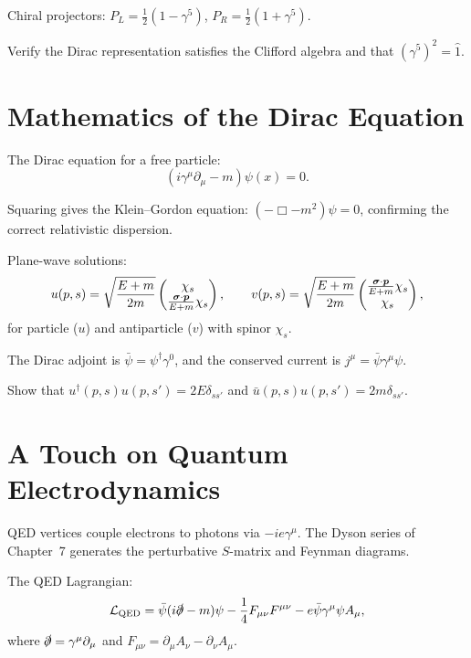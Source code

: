 Chiral projectors: $P_L=\frac12(1-\gamma^5)$, $P_R=\frac12(1+\gamma^5)$.

\begin{exercise}
Verify the Dirac representation satisfies the Clifford algebra and that
$(\gamma^5)^2=\hat 1$.
\end{exercise}

\section{Mathematics of the Dirac Equation}

The Dirac equation for a free particle:
\begin{equation}
(i\gamma^\mu\partial_\mu - m)\psi(x) = 0.
\label{eq:10.7.1}
\end{equation}

Squaring gives the Klein--Gordon equation:
$(-\Box-m^2)\psi=0$, confirming the correct relativistic dispersion.

Plane-wave solutions:
\begin{equation}
u(p,s) = \sqrt{\frac{E+m}{2m}}
\begin{pmatrix}\chi_s\\\frac{\bm{\sigma}\cdot\bm{p}}{E+m}\chi_s\end{pmatrix},\qquad
v(p,s) = \sqrt{\frac{E+m}{2m}}
\begin{pmatrix}\frac{\bm{\sigma}\cdot\bm{p}}{E+m}\chi_s\\\chi_s\end{pmatrix},
\label{eq:10.7.2}
\end{equation}
for particle ($u$) and antiparticle ($v$) with spinor $\chi_s$.

The Dirac adjoint is $\bar\psi=\psi^\dagger\gamma^0$, and the conserved
current is $j^\mu=\bar\psi\gamma^\mu\psi$.

\begin{exercise}
Show that $u^\dagger(p,s)u(p,s')=2E\delta_{ss'}$ and
$\bar u(p,s)u(p,s')=2m\delta_{ss'}$.
\end{exercise}

\section{A Touch on Quantum Electrodynamics}

QED vertices couple electrons to photons via $-ie\gamma^\mu$.
The Dyson series of Chapter~7 generates the perturbative $S$-matrix
and Feynman diagrams.

The QED Lagrangian:
\begin{equation}
\mathcal L_{\rm QED} = \bar\psi(i\slashed\partial-m)\psi
- \frac14 F_{\mu\nu}F^{\mu\nu} - e\bar\psi\gamma^\mu\psi A_\mu,
\label{eq:10.8.1}
\end{equation}
where $\slashed\partial=\gamma^\mu\partial_\mu$ and $F_{\mu\nu}=\partial_\mu A_\nu-\partial_\nu A_\mu$.

